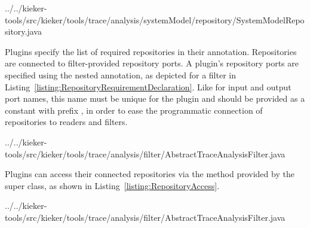 \enlargethispage{1cm}

\setJavaCodeListing
%
{../../kieker-tools/src/kieker/tools/trace/analysis/systemModel/repository/SystemModelRepository.java}

\noindent Plugins specify the list of required repositories in their %
 annotation. Repositories are connected to filter-provided %
repository ports. A plugin's repository ports are specified using the %
nested  annotation, as depicted for a %
\KiekerTraceAnalysis{} filter in Listing~\ref{listing:RepositoryRequirementDeclaration}. %
Like for input and output port names, this name must be unique for the plugin %
and should be provided as a  constant %
with prefix , in order to ease the programmatic %
connection of repositories to readers and filters. %

\setJavaCodeListing
%
{../../kieker-tools/src/kieker/tools/trace/analysis/filter/AbstractTraceAnalysisFilter.java}

\pagebreak

\noindent Plugins can access their connected repositories via the  %
method provided by the super class, as shown in Listing~\ref{listing:RepositoryAccess}. %

\setJavaCodeListing
%
{../../kieker-tools/src/kieker/tools/trace/analysis/filter/AbstractTraceAnalysisFilter.java}

